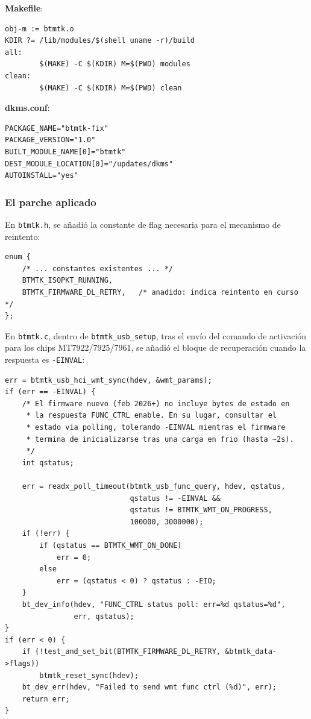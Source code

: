 \documentclass[12pt,a4paper]{article}
\begin{document}
\textbf{Makefile}:
\begin{lstlisting}[style=bash]
obj-m := btmtk.o
KDIR ?= /lib/modules/$(shell uname -r)/build
all:
        $(MAKE) -C $(KDIR) M=$(PWD) modules
clean:
        $(MAKE) -C $(KDIR) M=$(PWD) clean
\end{lstlisting}

\textbf{dkms.conf}:
\begin{lstlisting}[style=bash]
PACKAGE_NAME="btmtk-fix"
PACKAGE_VERSION="1.0"
BUILT_MODULE_NAME[0]="btmtk"
DEST_MODULE_LOCATION[0]="/updates/dkms"
AUTOINSTALL="yes"
\end{lstlisting}

\subsubsection{El parche aplicado}

En \texttt{btmtk.h}, se añadió la constante de flag necesaria para el
mecanismo de reintento:

\begin{lstlisting}[style=c]
enum {
    /* ... constantes existentes ... */
    BTMTK_ISOPKT_RUNNING,
    BTMTK_FIRMWARE_DL_RETRY,   /* anadido: indica reintento en curso */
};
\end{lstlisting}

En \texttt{btmtk.c}, dentro de \texttt{btmtk\_usb\_setup}, tras el envío del
comando de activación para los chips MT7922/7925/7961, se añadió el bloque
de recuperación cuando la respuesta es \texttt{-EINVAL}:

\begin{lstlisting}[style=c]
err = btmtk_usb_hci_wmt_sync(hdev, &wmt_params);
if (err == -EINVAL) {
    /* El firmware nuevo (feb 2026+) no incluye bytes de estado en
     * la respuesta FUNC_CTRL enable. En su lugar, consultar el
     * estado via polling, tolerando -EINVAL mientras el firmware
     * termina de inicializarse tras una carga en frio (hasta ~2s).
     */
    int qstatus;

    err = readx_poll_timeout(btmtk_usb_func_query, hdev, qstatus,
                             qstatus != -EINVAL &&
                             qstatus != BTMTK_WMT_ON_PROGRESS,
                             100000, 3000000);
    if (!err) {
        if (qstatus == BTMTK_WMT_ON_DONE)
            err = 0;
        else
            err = (qstatus < 0) ? qstatus : -EIO;
    }
    bt_dev_info(hdev, "FUNC_CTRL status poll: err=%d qstatus=%d",
                err, qstatus);
}
if (err < 0) {
    if (!test_and_set_bit(BTMTK_FIRMWARE_DL_RETRY, &btmtk_data->flags))
        btmtk_reset_sync(hdev);
    bt_dev_err(hdev, "Failed to send wmt func ctrl (%d)", err);
    return err;
}
\end{lstlisting}
\end{document}
